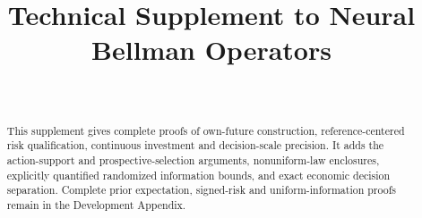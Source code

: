 \documentclass[ecta,nameyear,draft]{econsocart}
\begin{document}
\begin{frontmatter}
\title{Technical Supplement to Neural Bellman Operators}
\begin{aug}
\author[id=au1,addressref={add1}]{~}
\address[id=add1]{Peking University}
\end{aug}
\begin{abstract}This supplement gives complete proofs of own-future construction, reference-centered risk qualification, continuous investment and decision-scale precision. It adds the action-support and prospective-selection arguments, nonuniform-law enclosures, explicitly quantified randomized information bounds, and exact economic decision separation. Complete prior expectation, signed-risk and uniform-information proofs remain in the Development Appendix.\end{abstract}
\end{frontmatter}










\end{document}
